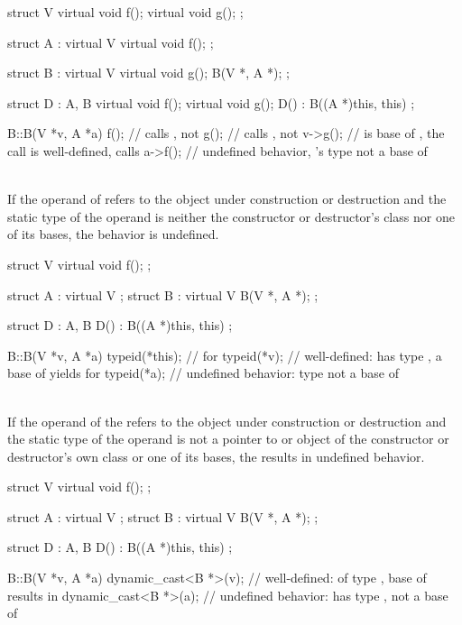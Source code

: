 \pnum
\begin{example}
\begin{codeblock}
struct V {
  virtual void f();
  virtual void g();
};

struct A : virtual V {
  virtual void f();
};

struct B : virtual V {
  virtual void g();
  B(V *, A *);
};

struct D : A, B {
  virtual void f();
  virtual void g();
  D() : B((A *)this, this) {}
};

B::B(V *v, A *a) {
  f();          // calls , not 
  g();          // calls , not 
  v->g();       //  is base of , the call is well-defined, calls 
  a->f();       // undefined behavior, 's type not a base of 
}
\end{codeblock}
\end{example}


\pnum
{} \\
If the operand of  refers to
the object under construction or destruction and the static type of the operand is neither the constructor or
destructor's class nor one of its bases, the behavior is undefined.

\pnum
\begin{example}
\begin{codeblock}
struct V {
  virtual void f();
};

struct A : virtual V {};
struct B : virtual V {
  B(V *, A *);
};

struct D : A, B {
  D() : B((A *)this, this) {}
};

B::B(V *v, A *a) {
  typeid(*this);        //  for 
  typeid(*v);           // well-defined:  has type , a base of  yields  for 
  typeid(*a);           // undefined behavior: type  not a base of 
}
\end{codeblock}
\end{example}


\pnum
{} \\
If the operand of the
 refers to the object under construction or destruction and the static type of the operand is
not a pointer to or object of the constructor or destructor's own class or one of its bases, the 
results in undefined behavior.

\pnum
\begin{example}
\begin{codeblock}
struct V {
  virtual void f();
};

struct A : virtual V {};
struct B : virtual V {
  B(V *, A *);
};

struct D : A, B {
  D() : B((A *)this, this) {}
};

B::B(V *v, A *a) {
  dynamic_cast<B *>(v); // well-defined:  of type ,  base of  results in 
  dynamic_cast<B *>(a); // undefined behavior:  has type ,  not a base of 
}
\end{codeblock}
\end{example}



